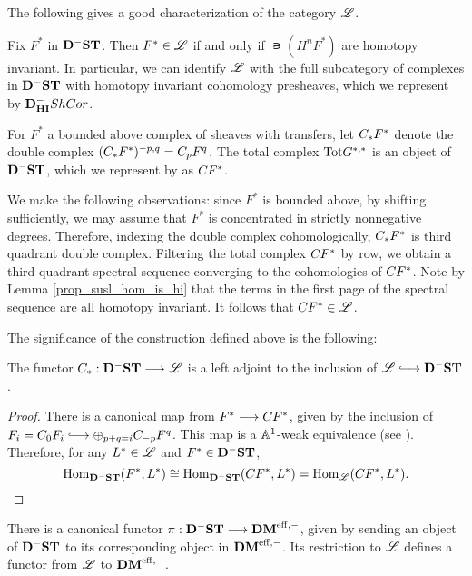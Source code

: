 The following gives a good characterization of the category 
$\ALocal$.

\begin{prop}
Fix $F^*$ in $\DShCor$. Then $F^* \in \ALocal$ if and only if
$\nis(H^n F^*)$ are homotopy invariant. In particular, we can
identify $\ALocal$ with the full subcategory of complexes in 
$\DShCor$ with homotopy invariant cohomology presheaves, which we 
represent by $\DCat^-_{\HI} \ShCor$.
\end{prop}

\begin{defn}
For $F^*$ a bounded above complex of sheaves with transfers,
let $\suslC F^*$ denote the double complex $(\suslC F^*)^{-p, q} = 
\suslC[p] F^q$. The total complex $\Tot G^{*,*}$ is an object of 
$\DShCor$, which we represent by as $\suslC[] F^*$. 
\end{defn}

We make the following observations: since $F^*$ is bounded above,
by shifting sufficiently, we may assume that $F^*$ is concentrated
in strictly nonnegative degrees. Therefore, indexing the double
complex cohomologically, $\suslC F^*$ is third quadrant double 
complex. Filtering the total complex $\suslC[] F^*$ by row, we 
obtain a third quadrant spectral sequence converging to the 
cohomologies of $\suslC[] F^*$. Note by Lemma 
\ref{prop_susl_hom_is_hi} that the terms in the first page of the 
spectral sequence are all homotopy invariant. It follows that
$\suslC[] F^* \in \ALocal$.

The significance of the construction defined above is the 
following:

\begin{prop}\label{prop_suslC_ALocal}
The functor $\suslC : \DShCor \to \ALocal$ is a left adjoint to
the inclusion of $\ALocal \into \DShCor$.
\end{prop}

\begin{proof}
There is a canonical map from $F^* \to \suslC[] F^*$,
given by the inclusion of $F_i = \suslC[0] F_i \into \oplus_{p + 
q = i} \suslC[-p] F^q$. This map is a $\A^1$-weak equivalence
(see \cite[Lemma 14.4]{MVW}). Therefore, for any $L^* \in \ALocal$
and $F^* \in \DShCor$,
\[
\hom_{\DShCor}(F^*, L^*) \cong \hom_{\DShCor}(\suslC[] F^*, L^*)
   = \hom_{\ALocal}(\suslC[] F^*, L^*).
\]
\end{proof}

There is a canonical functor $\pi: \DShCor \to \DMeff$, given
by sending an object of $\DShCor$ to its corresponding object in
$\DMeff$. Its restriction to $\ALocal$ defines a functor from
$\ALocal$ to $\DMeff$.

